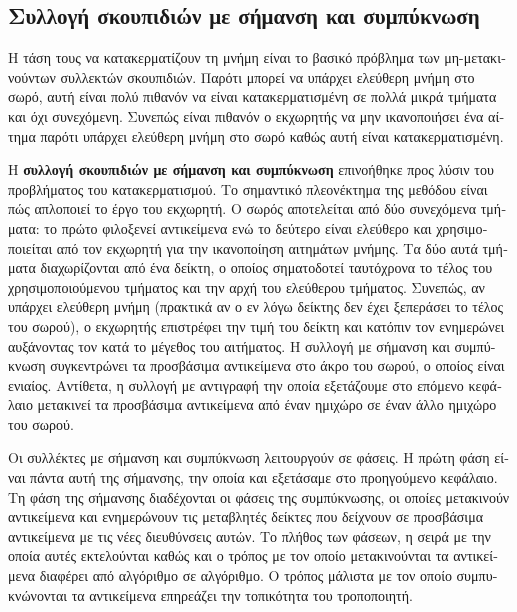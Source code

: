 \begin{greek}
\chapter{Συλλογή σκουπιδιών με σήμανση και συμπύκνωση}\label{ch:mrkcmp}
Η τάση τους να κατακερματίζουν τη μνήμη είναι το βασικό πρόβλημα των μη-μετακινούντων 
συλλεκτών σκουπιδιών. Παρότι μπορεί να υπάρχει ελεύθερη μνήμη στο σωρό, αυτή είναι 
πολύ πιθανόν να είναι κατακερματισμένη  σε πολλά μικρά τμήματα και όχι συνεχόμενη. 
Συνεπώς είναι πιθανόν ο εκχωρητής να μην ικανοποιήσει ένα αίτημα παρότι υπάρχει
ελεύθερη μνήμη στο σωρό καθώς αυτή είναι κατακερματισμένη.

Η \textbf{συλλογή σκουπιδιών με σήμανση και συμπύκνωση} επινοήθηκε προς λύσιν του προβλήματος του κατακερματισμού. 
Το σημαντικό πλεονέκτημα της μεθόδου είναι πώς απλοποιεί το έργο του εκχωρητή. Ο σωρός 
αποτελείται από δύο συνεχόμενα τμήματα: το πρώτο φιλοξενεί αντικείμενα ενώ το δεύτερο 
είναι ελεύθερο και χρησιμοποιείται από τον εκχωρητή για την ικανοποίηση αιτημάτων μνήμης. 
Τα δύο αυτά τμήματα διαχωρίζονται από ένα δείκτη, ο οποίος σηματοδοτεί ταυτόχρονα το 
τέλος του χρησιμοποιούμενου τμήματος και την αρχή του ελεύθερου τμήματος. Συνεπώς, αν 
υπάρχει ελεύθερη μνήμη (πρακτικά αν ο εν λόγω δείκτης δεν έχει ξεπεράσει το τέλος του 
σωρού), ο εκχωρητής επιστρέφει την τιμή του δείκτη και κατόπιν τον ενημερώνει αυξάνοντας
τον κατά το μέγεθος του αιτήματος. Η συλλογή με σήμανση και συμπύκνωση συγκεντρώνει τα 
προσβάσιμα αντικείμενα στο άκρο του σωρού, ο οποίος είναι ενιαίος. Αντίθετα, η συλλογή 
με αντιγραφή  την οποία εξετάζουμε στο επόμενο κεφάλαιο μετακινεί τα προσβάσιμα 
αντικείμενα από έναν ημιχώρο σε έναν άλλο ημιχώρο του σωρού.

Οι συλλέκτες με σήμανση και συμπύκνωση λειτουργούν σε φάσεις. Η πρώτη φάση είναι πάντα 
αυτή της σήμανσης, την οποία και εξετάσαμε στο προηγούμενο κεφάλαιο. Τη φάση της σήμανσης 
διαδέχονται οι φάσεις της συμπύκνωσης, οι οποίες μετακινούν αντικείμενα και ενημερώνουν 
τις μεταβλητές δείκτες που δείχνουν σε προσβάσιμα αντικείμενα με τις νέες διευθύνσεις 
αυτών. Το πλήθος των φάσεων, η σειρά με την οποία αυτές εκτελούνται καθώς και ο τρόπος με 
τον οποίο μετακινούνται τα αντικείμενα διαφέρει από αλγόριθμο σε αλγόριθμο. Ο τρόπος 
μάλιστα με τον οποίο συμπυκνώνονται τα αντικείμενα επηρεάζει την τοπικότητα του 
τροποποιητή.


\end{greek}
